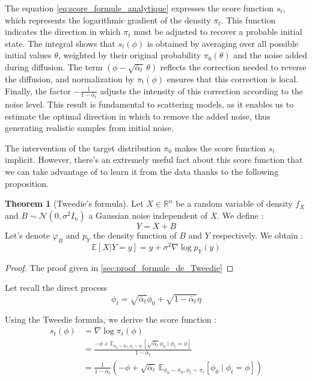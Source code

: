 \documentclass[a4paper,10pt]{article}
\theoremstyle{definition} %
\theoremstyle{definition} %
\theoremstyle{definition} %
\newtheorem{theorem}[definition]{Theorem}
\theoremstyle{definition} %
\begin{document}
The equation \eqref{eq:score_formule_analytique} expresses the score function \(s_t\), which represents the logarithmic gradient of the density \(\pi_t\). This function indicates the direction in which \(\pi_t\) must be adjusted to recover a probable initial state. The integral shows that \(s_t(\phi)\) is obtained by averaging over all possible initial values \(\theta\), weighted by their original probability \(\pi_0(\theta)\) and the noise added during diffusion. The term \((\phi - \sqrt{\bar{\alpha}_t}\, \theta)\) reflects the correction needed to reverse the diffusion, and normalization by \(\pi_t(\phi)\) ensures that this correction is local. Finally, the factor \(-\frac{1}{1- \bar \alpha_t}\) adjusts the intensity of this correction according to the noise level. This result is fundamental to scattering models, as it enables us to estimate the optimal direction in which to remove the added noise, thus generating realistic samples from initial noise.


The intervention of the target distribution $\pi_0$ makes the score function $s_t$ implicit. However, there's an extremely useful fact about this score function that we can take advantage of to learn it from the data thanks to the following proposition.

\begin{theorem}[Tweedie's formula]\label{theo:formule_de_Tweedie}
    Let $X \in \mathbb{R}^n$ be a random variable of density $f_X$ and $B \sim \mathcal{N}(0, \sigma^2 I_n)$ a Gaussian noise independent of $X$. We define :
    \[ Y = X + B \]
    Let's denote $\varphi_B$ and $p_Y$ the density function of $B$ and $Y$ respectively. We obtain :
    \[ \mathbb{E}[X | Y = y] = y + \sigma^2 \nabla \log p_Y(y) \]
\end{theorem}

\begin{proof}
    The proof given in \cref{sec:proof_formule_de_Tweedie}
\end{proof}

Let recall the direct process
\[ \phi_t = \sqrt{\bar \alpha_t} \phi_0 + \sqrt{1 - \bar \alpha_t} \eta \]

Using the  Tweedie formula, we derive the score function :
\begin{align*}
s_t(\phi) &= \nabla \log \pi_t(\phi) \\
&= \frac{-\phi + \mathbb{E}_{\phi_0 \sim \pi_0, \phi_t \sim \pi_t} \left[\sqrt{\bar \alpha_t}\, \phi_0 \mid \phi_t = \phi \right]}{1 - \bar \alpha_t} \\
&= \frac{1}{1 - \bar \alpha_t} \left( -\phi + \sqrt{\bar \alpha_t} \,\mathbb{E}_{\phi_0 \sim \pi_0, \phi_t \sim \pi_t} \left[ \phi_0 \mid \phi_t = \phi \right] \right)
\end{align*}
\end{document}
